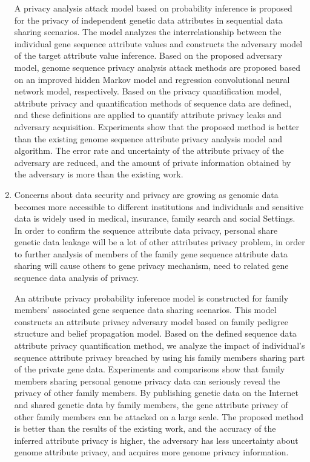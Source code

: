 \documentclass[pdftex,notypeinfo,twoside,openany,UTF8,fntef]{CASthesis}
\theoremstyle{THrm}{
	\newtheorem{question}{Question}[section]
	\newtheorem{property}{性质}[section]
	\newtheorem{assumption}{假设}[section]
	\newtheorem{claim}[lemma]{断言}
	
}
\begin{document}
\begin{enumerate}
	A privacy analysis attack model based on probability inference is proposed for the privacy of independent genetic data attributes in sequential data sharing scenarios. The model analyzes the interrelationship between the individual gene sequence attribute values and constructs the adversary model of the target attribute value inference. Based on the proposed adversary model, genome sequence privacy analysis attack methods are proposed based on an improved hidden Markov model and regression convolutional neural network model, respectively. Based on the privacy quantification model, attribute privacy and quantification methods of sequence data are defined, and these definitions are applied to quantify attribute privacy leaks and adversary acquisition. Experiments show that the proposed method is better than the existing genome sequence attribute privacy analysis model and algorithm. The error rate and uncertainty of the attribute privacy of the adversary are reduced, and the amount of private information obtained by the adversary is more than the existing work.
	
	\item 	
	Concerns about data security and privacy are growing as genomic data becomes more accessible to different institutions and individuals and sensitive data is widely used in medical, insurance, family search and social Settings. In order to confirm the sequence attribute data privacy, personal share genetic data leakage will be a lot of other attributes privacy problem, in order to further analysis of members of the family gene sequence attribute data sharing will cause others to gene privacy mechanism, need to related gene sequence data analysis of privacy.
	
	An attribute privacy probability inference model is constructed for family members' associated gene sequence data sharing scenarios. This model constructs an attribute privacy adversary model based on family pedigree structure and belief propagation model. Based on the defined sequence data attribute privacy quantification method, we analyze the impact of individual's sequence attribute privacy breached by using his family members sharing part of the private gene data. Experiments and comparisons show that family members sharing personal genome privacy data can seriously reveal the privacy of other family members. By publishing genetic data on the Internet and shared genetic data by family members, the gene attribute privacy of other family members can be attacked on a large scale. The proposed method is better than the results of the existing work, and the accuracy of the inferred attribute privacy is higher, the adversary has less uncertainty about genome attribute privacy, and acquires more genome privacy information.
	

\end{enumerate}
\end{document}
